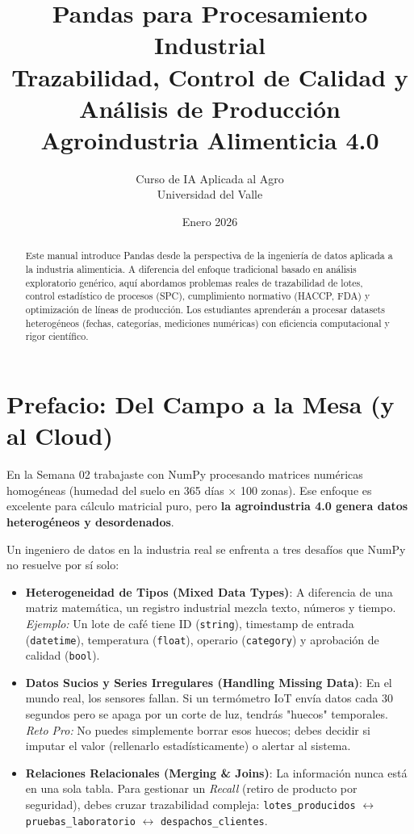 \documentclass[11pt, a4paper]{article}
\title{\textbf{Pandas para Procesamiento Industrial}\\
       \large Trazabilidad, Control de Calidad y Análisis de Producción\\
       Agroindustria Alimenticia 4.0}
\author{Curso de IA Aplicada al Agro\\
        Universidad del Valle}
\date{Enero 2026}
\begin{document}
\maketitle

\begin{abstract}
Este manual introduce Pandas desde la perspectiva de la ingeniería de datos aplicada a la industria alimenticia. A diferencia del enfoque tradicional basado en análisis exploratorio genérico, aquí abordamos problemas reales de trazabilidad de lotes, control estadístico de procesos (SPC), cumplimiento normativo (HACCP, FDA) y optimización de líneas de producción. Los estudiantes aprenderán a procesar datasets heterogéneos (fechas, categorías, mediciones numéricas) con eficiencia computacional y rigor científico.
\end{abstract}

\tableofcontents
\newpage
\section*{Prefacio: Del Campo a la Mesa (y al Cloud)}

En la Semana 02 trabajaste con NumPy procesando matrices numéricas homogéneas (humedad del suelo en 365 días × 100 zonas). Ese enfoque es excelente para cálculo matricial puro, pero \textbf{la agroindustria 4.0 genera datos heterogéneos y desordenados}.

Un ingeniero de datos en la industria real se enfrenta a tres desafíos que NumPy no resuelve por sí solo:

\begin{itemize}
    \item \textbf{Heterogeneidad de Tipos (Mixed Data Types)}: A diferencia de una matriz matemática, un registro industrial mezcla texto, números y tiempo.
    \\ \textit{Ejemplo:} Un lote de café tiene ID (\texttt{string}), timestamp de entrada (\texttt{datetime}), temperatura (\texttt{float}), operario (\texttt{category}) y aprobación de calidad (\texttt{bool}).

    \item \textbf{Datos Sucios y Series Irregulares (Handling Missing Data)}: En el mundo real, los sensores fallan. Si un termómetro IoT envía datos cada 30 segundos pero se apaga por un corte de luz, tendrás "huecos" temporales.
    \\ \textit{Reto Pro:} No puedes simplemente borrar esos huecos; debes decidir si imputar el valor (rellenarlo estadísticamente) o alertar al sistema.

    \item \textbf{Relaciones Relacionales (Merging \& Joins)}: La información nunca está en una sola tabla. Para gestionar un \textit{Recall} (retiro de producto por seguridad), debes cruzar trazabilidad compleja: \texttt{lotes\_producidos} $\leftrightarrow$ \texttt{pruebas\_laboratorio} $\leftrightarrow$ \texttt{despachos\_clientes}.
\end{itemize}
\end{document}
